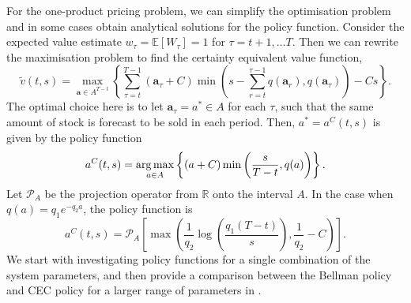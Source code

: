 \documentclass[main.tex]{subfiles}
\begin{document}
For the one-product pricing problem, we can simplify the optimisation
problem and in some cases obtain analytical solutions for the policy function.
Consider the expected value estimate $w_\tau=\mathbb{E}
[W_\tau]=1$ for $\tau=t+1,\dots T$.
Then we can rewrite the maximisation problem to find
the certainty equivalent value function,
\begin{equation}
  \widetilde{v}(t,s)=
  \max_{\mathbf a\in A^{T-t}}\left\{\sum_{\tau=t}^{T-1}(\mathbf
    a_\tau+C)\min\left(s-\sum_{r=t}^{\tau-1}q(\mathbf a_r),q(\mathbf a_\tau)\right)-Cs\right\}.
\end{equation}
The optimal choice here is to let $\mathbf a_\tau=a^*\in A$ for each
$\tau$, such that the same amount of stock is forecast to be sold in
each period.
Then, $a^*=a^C(t,s)$ is given by the policy function
\begin{equation}
  a^C(t,s)=\operatorname*{arg\,max}_{a\in A} \left\{(a+C)\min\left(
      \frac{s}{T-t},q(a)
    \right)\right\}.
\end{equation}
Let $\mathcal P_A$ be the projection operator from $\mathbb R$ onto the interval $A$.
In the case when $q(a)=q_1e^{-q_2a}$, the policy function is
\begin{equation}\label{eq:cec_policy}
  a^C(t,s)=\mathcal P_A\left[
    \max\left( \frac{1}{q_2}\log\left( \frac{q_1(T-t)}{s}\right),
      \frac{1}{q_2}-C  \right)\right].
\end{equation}
We start with investigating policy functions for a
single combination of the  system
parameters, and then provide a
comparison between the Bellman policy and CEC policy for a larger
range of parameters in .
\end{document}
